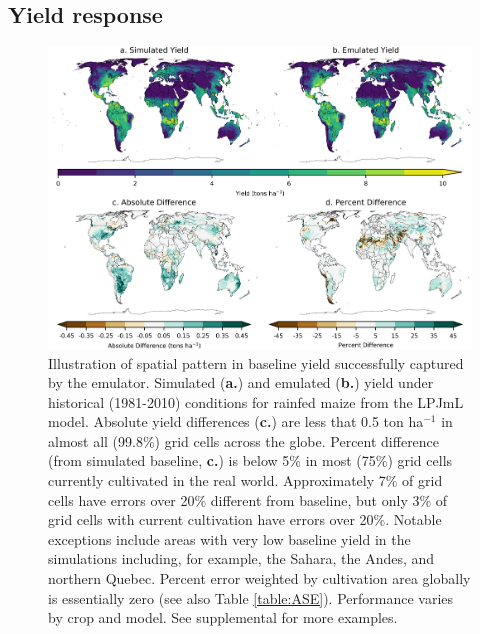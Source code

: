 \documentclass[gmd, manuscript]{copernicus} %
\begin{document}
\subsection{Yield response}
\begin{figure}[ht]
\centering
    \includegraphics[width=16cm]{figures/lpjml_maize.png}
    \caption{
    Illustration of spatial pattern in baseline yield successfully captured by the emulator.
    Simulated (\textbf{a.}) and emulated (\textbf{b.}) yield under historical (1981-2010) conditions for rainfed maize from the LPJmL model.
    Absolute yield differences (\textbf{c.}) are less that 0.5 ton ha$^{-1}$ in almost all (99.8\%) grid cells across the globe.
    Percent difference (from simulated baseline, \textbf{c.}) is below 5\% in most (75\%) grid cells currently cultivated in the real world.
    Approximately 7\% of grid cells have errors over 20\% different from baseline, but only 3\% of grid cells with current cultivation \citep{Portmann2010} have errors over 20\%.
    Notable exceptions include areas with very low baseline yield in the simulations including, for example, the Sahara, the Andes, and northern Quebec. 
    Percent error weighted by cultivation area globally is essentially zero (see also Table \ref{table:ASE}).
    Performance varies by crop and model. 
    See supplemental for more examples.
    }
   \label{fig:map_pattern}
\end{figure}
\end{document}
